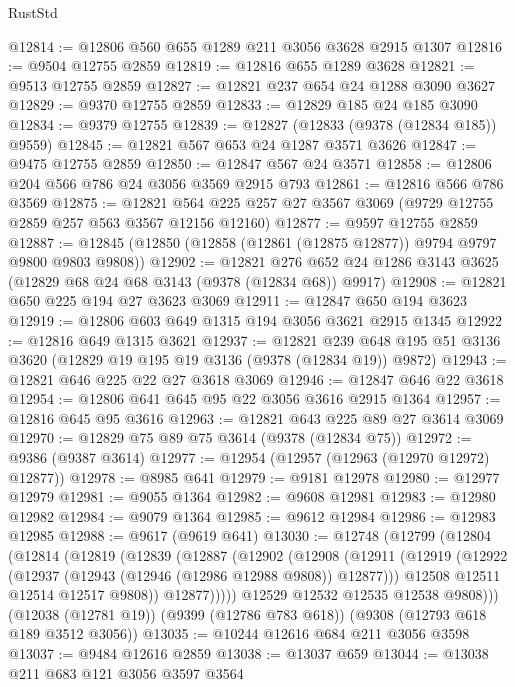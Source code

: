 \begin{lexlean}{RustStd}
\begin{coremodule}
@12814 := @12806 @560 @655 @1289 @211 @3056 @3628 @2915 @1307
@12816 := @9504 @12755 @2859
@12819 := @12816 @655 @1289 @3628
@12821 := @9513 @12755 @2859
@12827 := @12821 @237 @654 @24 @1288 @3090 @3627
@12829 := @9370 @12755 @2859
@12833 := @12829 @185 @24 @185 @3090
@12834 := @9379 @12755
@12839 := @12827 (@12833 (@9378 (@12834 @185)) @9559)
@12845 := @12821 @567 @653 @24 @1287 @3571 @3626
@12847 := @9475 @12755 @2859
@12850 := @12847 @567 @24 @3571
@12858 := @12806 @204 @566 @786 @24 @3056 @3569 @2915 @793
@12861 := @12816 @566 @786 @3569
@12875 := @12821 @564 @225 @257 @27 @3567 @3069 (@9729 @12755 @2859 @257 @563 @3567 @12156 @12160)
@12877 := @9597 @12755 @2859
@12887 := @12845 (@12850 (@12858 (@12861 (@12875 @12877)) @9794 @9797 @9800 @9803 @9808))
@12902 := @12821
    @276
    @652
    @24
    @1286
    @3143
    @3625
    (@12829 @68 @24 @68 @3143 (@9378 (@12834 @68)) @9917)
@12908 := @12821 @650 @225 @194 @27 @3623 @3069
@12911 := @12847 @650 @194 @3623
@12919 := @12806 @603 @649 @1315 @194 @3056 @3621 @2915 @1345
@12922 := @12816 @649 @1315 @3621
@12937 := @12821
    @239
    @648
    @195
    @51
    @3136
    @3620
    (@12829 @19 @195 @19 @3136 (@9378 (@12834 @19)) @9872)
@12943 := @12821 @646 @225 @22 @27 @3618 @3069
@12946 := @12847 @646 @22 @3618
@12954 := @12806 @641 @645 @95 @22 @3056 @3616 @2915 @1364
@12957 := @12816 @645 @95 @3616
@12963 := @12821 @643 @225 @89 @27 @3614 @3069
@12970 := @12829 @75 @89 @75 @3614 (@9378 (@12834 @75))
@12972 := @9386 (@9387 @3614)
@12977 := @12954 (@12957 (@12963 (@12970 @12972) @12877))
@12978 := @8985 @641
@12979 := @9181 @12978
@12980 := @12977 @12979
@12981 := @9055 @1364
@12982 := @9608 @12981
@12983 := @12980 @12982
@12984 := @9079 @1364
@12985 := @9612 @12984
@12986 := @12983 @12985
@12988 := @9617 (@9619 @641)
@13030 := @12748
    (@12799
      (@12804
        (@12814
          (@12819
            (@12839
              (@12887
                (@12902
                  (@12908
                    (@12911
                      (@12919
                        (@12922 (@12937 (@12943 (@12946 (@12986 @12988 @9808)) @12877)))
                        @12508
                        @12511
                        @12514
                        @12517
                        @9808))
                    @12877)))))
          @12529
          @12532
          @12535
          @12538
          @9808)))
    (@12038 (@12781 @19))
    (@9399 (@12786 @783 @618))
    (@9308 (@12793 @618 @189 @3512 @3056))
@13035 := @10244 @12616 @684 @211 @3056 @3598
@13037 := @9484 @12616 @2859
@13038 := @13037 @659
@13044 := @13038 @211 @683 @121 @3056 @3597 @3564

\end{coremodule}
\end{lexlean}
